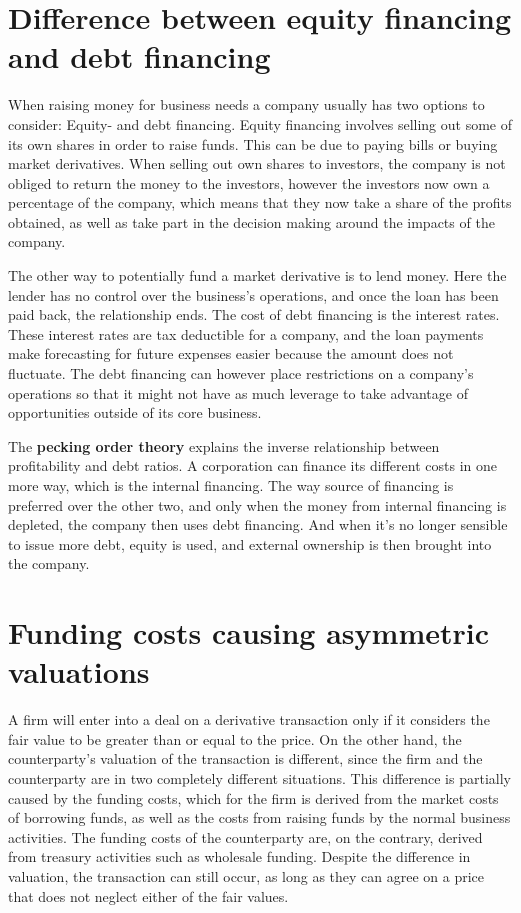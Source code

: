\documentclass[10pt,a4paper]{article}
\begin{document}
    \section{Difference between equity financing and debt financing}
        When raising money for business needs a company usually has two options to consider: Equity- and debt financing. Equity financing involves selling out some of its own shares in order to raise funds. This can be due to paying bills or buying market derivatives. When selling out own shares to investors, the company is not obliged to return the money to the investors, however the investors now own a percentage of the company, which means that they now take a share of the profits obtained, as well as take part in the decision making around the impacts of the company.

        The other way to potentially fund a market derivative is to lend money. Here the lender has no control over the business's operations, and once the loan has been paid back, the relationship ends. The cost of debt financing is the interest rates. These interest rates are tax deductible for a company, and the loan payments make forecasting for future expenses easier because the amount does not fluctuate. The debt financing can however place restrictions on a company's operations so that it might not have as much leverage to take advantage of opportunities outside of its core business.
        
        The \textbf{pecking order theory} explains the inverse relationship between profitability and debt ratios. A corporation can finance its different costs in one more way, which is the internal financing. The way source of financing is preferred over the other two, and only when the money from internal financing is depleted, the company then uses debt financing. And when it's no longer sensible to issue more debt, equity is used, and external ownership is then brought into the company. 

        
    \section{Funding costs causing asymmetric valuations}
        A firm will enter into a deal on a derivative transaction
        only if it considers the fair value to be greater than or equal to the price.
        On the other hand, the counterparty's valuation of the transaction is different,
        since the firm and the counterparty are in two completely different situations.
        This difference is partially caused by the funding costs,
        which for the firm is derived from the market costs of borrowing funds,
        as well as the costs from raising funds by the normal business activities.
        The funding costs of the counterparty are, on the contrary, derived from treasury activities such as wholesale funding.
        Despite the difference in valuation, the transaction can still occur,
        as long as they can agree on a price that does not neglect either of the fair values.
\end{document}
